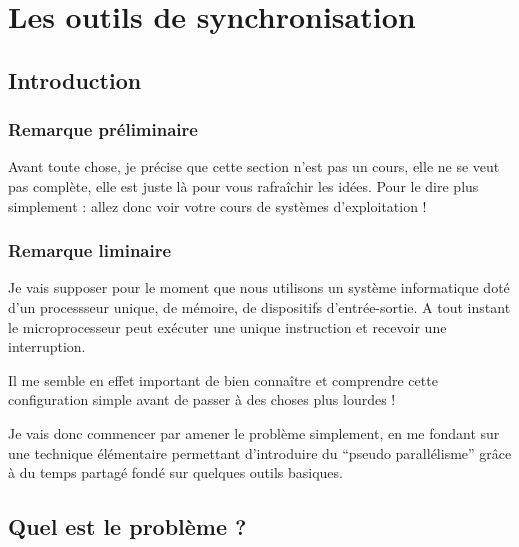 %
\section{Les outils de synchronisation}

%
\subsection{Introduction}

\subsubsection{Remarque préliminaire}

   Avant toute chose, je précise que cette section n'est pas un cours,
elle ne se veut pas complète, elle est juste là pour vous rafraîchir
les idées. Pour le dire plus simplement : allez donc voir votre cours de
   systèmes d'exploitation !

\subsubsection{Remarque liminaire}

   Je vais supposer pour le moment que nous utilisons un système
informatique doté d'un processseur unique, de mémoire, de dispositifs
d'entrée-sortie. A tout instant le microprocesseur peut exécuter une
unique instruction et recevoir une interruption.

   Il me semble en effet important de bien connaître et comprendre
cette configuration simple avant de passer à des choses plus lourdes !


   Je vais donc commencer par amener le problème simplement, en me
fondant sur une technique élémentaire permettant d'introduire du
``pseudo parallélisme'' grâce à du temps partagé fondé sur quelques
outils basiques.

%
\subsection{Quel est le problème ?}

